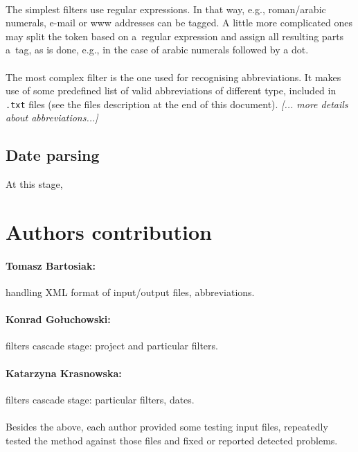 \documentclass[oneside,12pt]{article}
\begin{document}
\paragraph{}
The simplest filters use regular expressions. In that way, e.g., roman/arabic numerals, e-mail or www addresses can be tagged. A little more complicated ones may split the token based on a~regular expression and assign all resulting parts a~tag, as is done, e.g., in the case of arabic numerals followed by a dot.

\paragraph{}
The most complex filter is the one used for recognising abbreviations. It makes use of some predefined list of valid abbreviations of different type, included in \texttt{.txt} files (see the files description at the end of this document). \textit{[... more details about abbreviations...]}

\subsection{Date parsing}
At this stage, 

\section{Authors contribution}

\paragraph{Tomasz Bartosiak:} handling XML format of input/output files, abbreviations.

\paragraph{Konrad Gołuchowski:} filters cascade stage: project and particular filters.

\paragraph{Katarzyna Krasnowska:} filters cascade stage: particular filters, dates.

\paragraph{}
Besides the above, each author provided some testing input files, repeatedly tested the method against those files and fixed or reported detected problems. 
\end{document}
